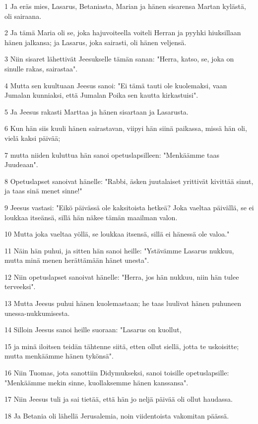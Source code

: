 \par 1 Ja eräs mies, Lasarus, Betaniasta, Marian ja hänen sisarensa Martan kylästä, oli sairaana.
\par 2 Ja tämä Maria oli se, joka hajuvoiteella voiteli Herran ja pyyhki hiuksillaan hänen jalkansa; ja Lasarus, joka sairasti, oli hänen veljensä.
\par 3 Niin sisaret lähettivät Jeesukselle tämän sanan: "Herra, katso, se, joka on sinulle rakas, sairastaa".
\par 4 Mutta sen kuultuaan Jeesus sanoi: "Ei tämä tauti ole kuolemaksi, vaan Jumalan kunniaksi, että Jumalan Poika sen kautta kirkastuisi".
\par 5 Ja Jeesus rakasti Marttaa ja hänen sisartaan ja Lasarusta.
\par 6 Kun hän siis kuuli hänen sairastavan, viipyi hän siinä paikassa, missä hän oli, vielä kaksi päivää;
\par 7 mutta niiden kuluttua hän sanoi opetuslapsilleen: "Menkäämme taas Juudeaan".
\par 8 Opetuslapset sanoivat hänelle: "Rabbi, äsken juutalaiset yrittivät kivittää sinut, ja taas sinä menet sinne!"
\par 9 Jeesus vastasi: "Eikö päivässä ole kaksitoista hetkeä? Joka vaeltaa päivällä, se ei loukkaa itseänsä, sillä hän näkee tämän maailman valon.
\par 10 Mutta joka vaeltaa yöllä, se loukkaa itsensä, sillä ei hänessä ole valoa."
\par 11 Näin hän puhui, ja sitten hän sanoi heille: "Ystävämme Lasarus nukkuu, mutta minä menen herättämään hänet unesta".
\par 12 Niin opetuslapset sanoivat hänelle: "Herra, jos hän nukkuu, niin hän tulee terveeksi".
\par 13 Mutta Jeesus puhui hänen kuolemastaan; he taas luulivat hänen puhuneen unessa-nukkumisesta.
\par 14 Silloin Jeesus sanoi heille suoraan: "Lasarus on kuollut,
\par 15 ja minä iloitsen teidän tähtenne siitä, etten ollut siellä, jotta te uskoisitte; mutta menkäämme hänen tykönsä".
\par 16 Niin Tuomas, jota sanottiin Didymukseksi, sanoi toisille opetuslapsille: "Menkäämme mekin sinne, kuollaksemme hänen kanssansa".
\par 17 Niin Jeesus tuli ja sai tietää, että hän jo neljä päivää oli ollut haudassa.
\par 18 Ja Betania oli lähellä Jerusalemia, noin viidentoista vakomitan päässä.
